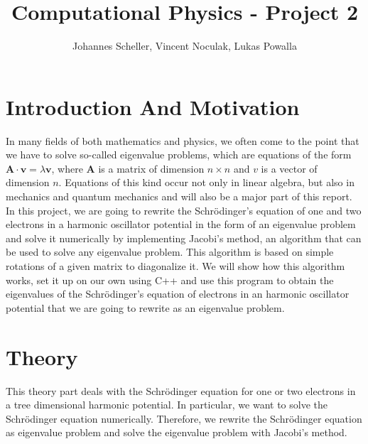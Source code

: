 \documentclass[10pt,a4paper]{article}
\author{Johannes Scheller, Vincent Noculak, Lukas Powalla}
\title{Computational Physics - Project 2}
\begin{document}
\maketitle
\newpage
\tableofcontents
\newpage
\section{Introduction And Motivation}
In many fields of both mathematics and physics, we often come to the point that we have to solve so-called eigenvalue problems, which are equations of the form $\mathbf{A}\cdot\mathbf{v}=\lambda\mathbf{v}$, where $\mathbf{A}$ is a matrix of dimension $n\times n$ and $v$ is a vector of dimension $n$. Equations of this kind occur not only in linear algebra, but also in mechanics and quantum mechanics and will also be a major part of this report. In this project, we are going to rewrite the Schrödinger's equation of one and two electrons in a harmonic oscillator potential in the form of an eigenvalue problem and solve it numerically by implementing Jacobi's method, an algorithm that can be used to solve any eigenvalue problem. This algorithm is based on simple rotations of a given matrix to diagonalize it. We will show how this algorithm works, set it up on our own using C++ and use this program to obtain the eigenvalues of the Schrödinger's equation of electrons in an harmonic oscillator potential that we are going to rewrite as an eigenvalue problem.

\section{Theory}
This theory part deals with the Schrödinger equation for one or two electrons in a tree dimensional harmonic potential. In particular, we want to solve the Schrödinger equation numerically. Therefore, we rewrite the Schrödinger equation as eigenvalue problem and solve the eigenvalue problem with Jacobi's method. 
\end{document}

